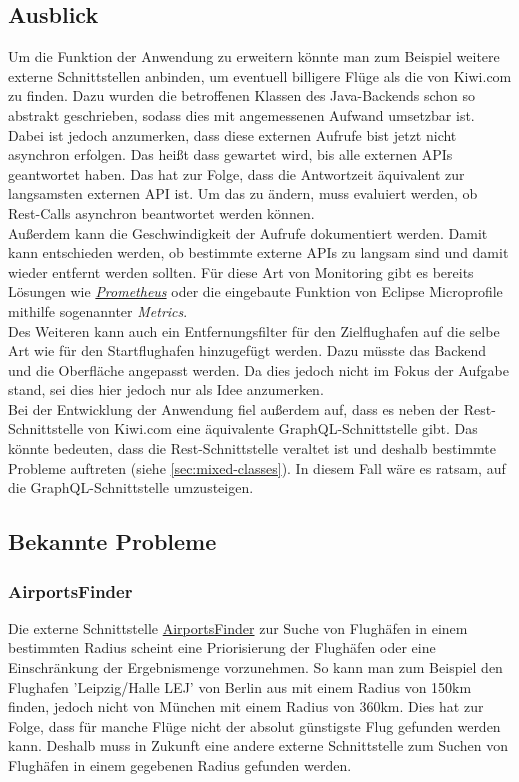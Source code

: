 \documentclass[12pt,twoside,a4paper]{article}
\begin{document}
\subsection{Ausblick}
Um die Funktion der Anwendung zu erweitern könnte man zum Beispiel weitere externe Schnittstellen anbinden, um eventuell billigere Flüge als die von Kiwi.com zu finden. Dazu wurden die betroffenen Klassen des Java-Backends schon so abstrakt geschrieben, sodass dies mit angemessenen Aufwand umsetzbar ist.\\
Dabei ist jedoch anzumerken, dass diese externen Aufrufe bist jetzt nicht asynchron erfolgen. Das heißt dass gewartet wird, bis alle externen APIs geantwortet haben. Das hat zur Folge, dass die Antwortzeit äquivalent zur langsamsten externen API ist. Um das zu ändern, muss evaluiert werden, ob Rest-Calls asynchron beantwortet werden können.\\
Außerdem kann die Geschwindigkeit der Aufrufe dokumentiert werden. Damit kann entschieden werden, ob bestimmte externe APIs zu langsam sind und damit wieder entfernt werden sollten. Für diese Art von Monitoring gibt es bereits Lösungen wie \href{https://prometheus.io/}{\textit{Prometheus}} oder die eingebaute Funktion von Eclipse Microprofile mithilfe sogenannter \textit{Metrics}.\\
Des Weiteren kann auch ein Entfernungsfilter für den Zielflughafen auf die selbe Art wie für den Startflughafen hinzugefügt werden. Dazu müsste das Backend und die Oberfläche angepasst werden. Da dies jedoch nicht im Fokus der Aufgabe stand, sei dies hier jedoch nur als Idee anzumerken.\\
Bei der Entwicklung der Anwendung fiel außerdem auf, dass es neben der Rest-Schnittstelle von Kiwi.com eine äquivalente GraphQL-Schnittstelle gibt. Das könnte bedeuten, dass die Rest-Schnittstelle veraltet ist und deshalb bestimmte Probleme auftreten (siehe \ref{sec:mixed-classes}). In diesem Fall wäre es ratsam, auf die GraphQL-Schnittstelle umzusteigen.\newline\cite{kiwi-tequila}
\subsection{Bekannte Probleme}
\subsubsection{AirportsFinder}
Die externe Schnittstelle \href{https://rapidapi.com/cometari/api/airportsfinder}{AirportsFinder} zur Suche von Flughäfen in einem bestimmten Radius scheint eine Priorisierung der Flughäfen oder eine Einschränkung der Ergebnismenge vorzunehmen. So kann man zum Beispiel den Flughafen 'Leipzig/Halle LEJ' von Berlin aus mit einem Radius von 150km finden, jedoch nicht von München mit einem Radius von 360km. Dies hat zur Folge, dass für manche Flüge nicht der absolut günstigste Flug gefunden werden kann. Deshalb muss in Zukunft eine andere externe Schnittstelle zum Suchen von Flughäfen in einem gegebenen Radius gefunden werden.
\end{document}
